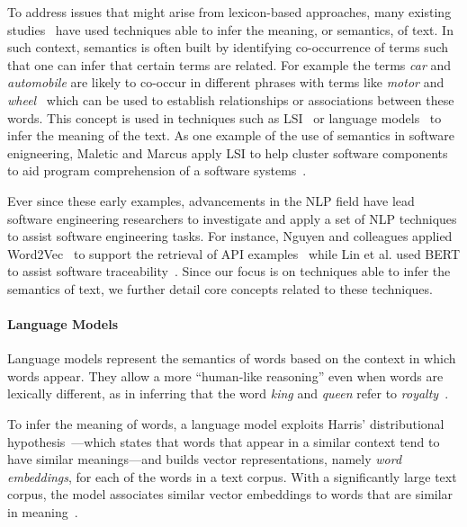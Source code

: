 To address issues that might arise from lexicon-based approaches,
many existing studies~\cite{silva2019, Huang2018, Ye2016, huang2018automating} have used techniques able to infer the meaning, or semantics, of text. 
In such context, semantics is often built by identifying co-occurrence of terms such that one can infer that certain terms are related. For example 
the terms \textit{car} and \textit{automobile} are likely to co-occur in different phrases with terms like \textit{motor} and \textit{wheel}~\cite{Bavota2016}
which can be used to establish relationships or associations between these words.
This concept is used in techniques such as \acf{LSI}~\cite{deerwester1990LSI} or language models~\cite{Mikolov2013} to infer the meaning of the text.
As one example of the use of semantics in
software enigneering, Maletic and Marcus apply \acs{LSI} to help cluster software components to aid
program comprehension of a software systems~\cite{Marcus2003}.


Ever since these early examples, advancements in the \acf{NLP} field have lead software engineering researchers 
to investigate and apply a set of \acs{NLP} techniques to assist software engineering tasks. For instance,
Nguyen and colleagues
applied Word2Vec~\cite{Mikolov2013} to support the retrieval of API
examples~\cite{nguyen2017} while Lin et al. used BERT to assist software traceability~\cite{Lin2021}. 
Since our focus is on techniques able to infer the semantics of text, we further detail core concepts related to these techniques. 



\paragraph{\textbf{Language Models}}

Language models represent the semantics of words based on the context in which words appear. They allow a more ``human-like reasoning'' even when words are lexically different, as in inferring that the word \textit{king} and
\textit{queen} refer to \textit{royalty}~\cite{Mikolov2013}.


To infer the meaning of words, a language model exploits Harris' distributional hypothesis~\cite{harris1954distributional}---which states that words that appear in a similar context tend to have similar meanings---and builds vector representations, namely \textit{word embeddings}, for each of the words in a text corpus.
With a significantly large text corpus, the model associates similar vector embeddings to words that are similar in meaning~\cite{Ye2016}. 





